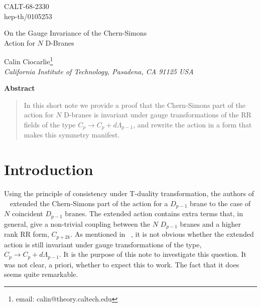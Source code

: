 \documentclass[a4paper,12pt]{article}
\begin{document}
\vspace*{-.6in}
\thispagestyle{empty}
\begin{flushright}
CALT-68-2330\\
hep-th/0105253
\end{flushright}

\vspace{.5in}

{\Large
\begin{center}

On the Gauge Invariance of the Chern-Simons \\
 Action for $N$ D-Branes
\end{center}}
\begin{center}
Calin Ciocarlie\footnote{email: calin@theory.caltech.edu} \\
\emph{ California Institute of Technology, Pasadena, CA  91125 USA}
\end{center}
\vspace*{1in}

\begin{center}
\textbf{Abstract}
\end{center}
\begin{quotation}
\noindent In this short note we provide a proof that the Chern-Simons part of the action for $N$ D-branes is invariant under gauge transformations of the RR fields of the type $C_p \rightarrow C_p+d\Lambda_{p-1}$, and rewrite the action in a form that makes this symmetry manifest.
\end{quotation}
\vfil
\newpage


\section{Introduction}

   Using the principle of consistency under T-duality transformation, the authors of ~\cite{myers, taylor1} extended the Chern-Simons part of the action for a $D_{p-1}$ brane to the case of $N$ coincident $D_{p-1}$ branes.   The extended action contains extra terms that, in general, give a non-trivial coupling between the $N$ $D_{p-1}$ branes and a higher rank RR form, $C_{p+2k}$. As mentioned in ~\cite{schwarz}, it is not obvious whether the extended action is still invariant under gauge transformations of the type,  $ C_p \rightarrow C_p+d\Lambda_{p-1}$. It is the purpose of this note to investigate this question. It was not clear, a priori, whether to expect this to work. The fact that it does seems quite remarkable. 
    
\end{document}
